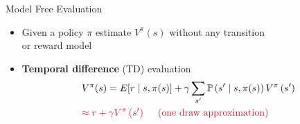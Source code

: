 \documentclass[11pt,table]{beamer}
\begin{document}
\begin{frame}{Model Free Evaluation}

\begin{itemize}
    \item Given a policy $\pi$ estimate $V^{\pi}(s)$ without any transition\\ or reward model

\item \textbf{Temporal difference} (TD) evaluation
$$
\begin{aligned}
& V^{\pi}(s)=E[r \mid s, \pi(s)]+\gamma \sum_{s^{\prime}} \mathbb{P}\left(s^{\prime} \mid s , \pi(s)\right) V^{\pi}\left(s^{\prime}\right) \\
& \textcolor{red1}{\approx r+\gamma V^{\pi}\left(s^{\prime}\right) \quad \text { (one draw approximation) }}
\end{aligned}
$$
\end{itemize}
    
\end{frame}
\end{document}
